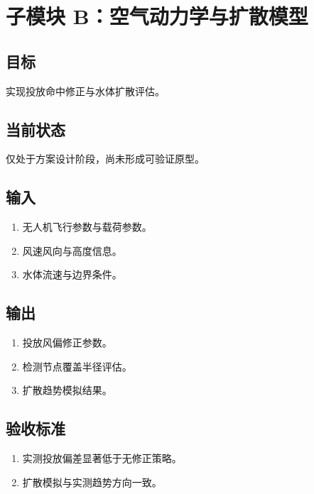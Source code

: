 \documentclass[12pt,a4paper,openany]{ctexrep}
\begin{document}
\section{子模块 B：空气动力学与扩散模型}

\subsection{目标}

实现投放命中修正与水体扩散评估。

\subsection{当前状态}

仅处于方案设计阶段，尚未形成可验证原型。

\subsection{输入}

\begin{enumerate}
\item 无人机飞行参数与载荷参数。
\item 风速风向与高度信息。
\item 水体流速与边界条件。
\end{enumerate}

\subsection{输出}

\begin{enumerate}
\item 投放风偏修正参数。
\item 检测节点覆盖半径评估。
\item 扩散趋势模拟结果。
\end{enumerate}

\subsection{验收标准}

\begin{enumerate}
\item 实测投放偏差显著低于无修正策略。
\item 扩散模拟与实测趋势方向一致。
\end{enumerate}

\end{document}
